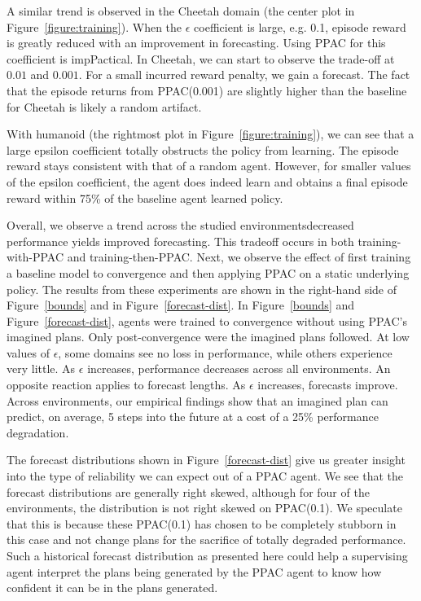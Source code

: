 \documentclass{article}
\begin{document}
            A similar trend is observed in the Cheetah domain (the center plot in Figure~\ref{figure:training}). When the $\epsilon$ coefficient is large, e.g. 0.1, episode reward is greatly reduced with an improvement in forecasting. Using PPAC for this coefficient is impPactical. In Cheetah, we can start to observe the trade-off at $0.01$ and $0.001$. For a small incurred reward penalty, we gain a forecast. The fact that the episode returns from PPAC(0.001) are slightly higher than the baseline for Cheetah is likely a random artifact.

            With humanoid (the rightmost plot in Figure~\ref{figure:training}), we can see that a large epsilon coefficient totally obstructs the policy from learning. The episode reward stays consistent with that of a random agent. However, for smaller values of the epsilon coefficient, the agent does indeed learn and obtains a final episode reward within 75\% of the baseline agent learned policy. 

            Overall, we observe a trend across the studied environments\textemdash decreased performance yields improved forecasting. This tradeoff occurs in both training-with-PPAC and training-then-PPAC. Next, we observe the effect of first training a baseline model to convergence and then applying PPAC on a static underlying policy. The results from these experiments are shown in the right-hand side of Figure~\ref{bounds} and in Figure~\ref{forecast-dist}. In Figure~\ref{bounds} and Figure~\ref{forecast-dist}, agents were trained to convergence without using PPAC's imagined plans. Only post-convergence were the imagined plans followed. At low values of $\epsilon$, some domains see no loss in performance, while others experience very little. As $\epsilon$ increases, performance decreases across all environments. An opposite reaction applies to forecast lengths. As $\epsilon$ increases, forecasts improve. Across environments, our empirical findings show that an imagined plan can predict, on average, 5 steps into the future at a cost of a 25\% performance degradation.

            The forecast distributions shown in Figure~\ref{forecast-dist} give us greater insight into the type of reliability we can expect out of a PPAC agent. We see that the forecast distributions are generally right skewed, although for four of the environments, the distribution is not right skewed on PPAC(0.1). We speculate that this is because these PPAC(0.1) has chosen to be completely stubborn in this case and not change plans for the sacrifice of totally degraded performance. Such a historical forecast distribution as presented here could help a supervising agent interpret the plans being generated by the PPAC agent to know how confident it can be in the plans generated.
\end{document}
